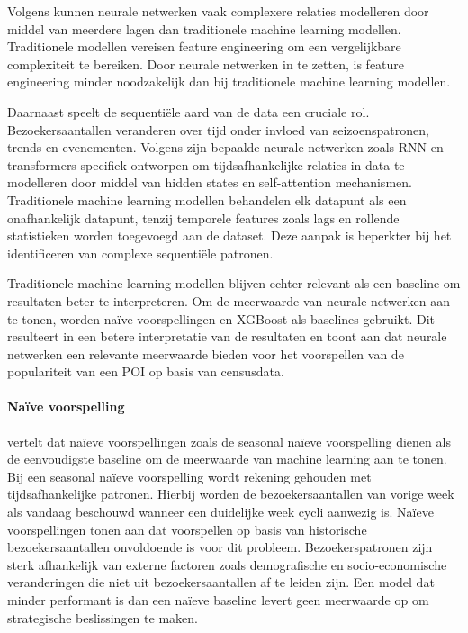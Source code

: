 Volgens \textcite{ReinaJimenez2026} kunnen neurale netwerken vaak complexere relaties modelleren door middel van meerdere lagen dan traditionele machine learning modellen. Traditionele modellen vereisen feature engineering om een vergelijkbare complexiteit te bereiken. Door neurale netwerken in te zetten, is feature engineering minder noodzakelijk dan bij traditionele machine learning modellen.

Daarnaast speelt de sequentiële aard van de data een cruciale rol. Bezoekersaantallen veranderen over tijd onder invloed van seizoenspatronen, trends en evenementen. Volgens \textcite{Lim2021} zijn bepaalde neurale netwerken zoals RNN en transformers specifiek ontworpen om tijdsafhankelijke relaties in data te modelleren door middel van hidden states en self-attention mechanismen. Traditionele machine learning modellen behandelen elk datapunt als een onafhankelijk datapunt, tenzij temporele features zoals lags en rollende statistieken worden toegevoegd aan de dataset. Deze aanpak is beperkter bij het identificeren van complexe sequentiële patronen.

Traditionele machine learning modellen blijven echter relevant als een baseline om resultaten beter te interpreteren. Om de meerwaarde van neurale netwerken aan te tonen, worden naïve voorspellingen en XGBoost als baselines gebruikt. Dit resulteert in een betere interpretatie van de resultaten en toont aan dat neurale netwerken een relevante meerwaarde bieden voor het voorspellen van de populariteit van een POI op basis van censusdata.

\paragraph{Naïve voorspelling}

\textcite{Unterberger2021} vertelt dat naïeve voorspellingen zoals de seasonal naïeve voorspelling dienen als de eenvoudigste baseline om de meerwaarde van machine learning aan te tonen. Bij een seasonal naïeve voorspelling wordt rekening gehouden met tijdsafhankelijke patronen. Hierbij worden de bezoekersaantallen van vorige week als vandaag beschouwd wanneer een duidelijke week cycli aanwezig is. Naïeve voorspellingen tonen aan dat voorspellen op basis van historische bezoekersaantallen onvoldoende is voor dit probleem. Bezoekerspatronen zijn sterk afhankelijk van externe factoren zoals demografische en socio-economische veranderingen die niet uit bezoekersaantallen af te leiden zijn. Een model dat minder performant is dan een naïeve baseline levert geen meerwaarde op om strategische beslissingen te maken.

